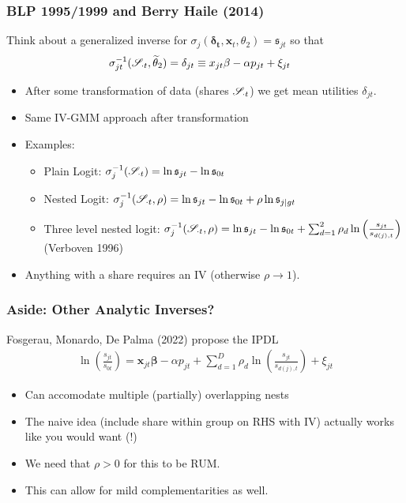 \documentclass[aspectratio=169,10pt]{beamer}
\begin{document}
\begin{frame}
\frametitle{BLP 1995/1999 and Berry Haile (2014)}
Think about a \alert{generalized inverse} for $\sigma_{j}(\symbf{\delta_{t}}, \symbf{x}_t,\theta_2) = \mathfrak{s}_{jt}$ so that 
\begin{align*}
 \sigma_{jt}^{-1}(\mathscr{S}_{\cdot t},\widetilde{\theta}_2)&= \delta_{jt} \equiv x_{jt} \beta -\alpha p_{jt} +  \xi_{jt} 
\end{align*}
 \begin{itemize}
\item After some transformation of data (shares $\mathscr{S}_{\cdot t}$) we get \alert{mean utilities} $\delta_{jt}$.
\item Same IV-GMM approach after transformation
\item Examples:
\begin{itemize}
\item Plain Logit: $\sigma_{j}^{-1}(\mathscr{S}_{\cdot t}) = \ln \mathfrak{s}_{jt}- \ln \mathfrak{s}_{0t}$
\item Nested Logit: $\sigma_{j}^{-1}(\mathscr{S}_{\cdot t},\rho) = \ln \mathfrak{s}_{jt}- \ln \mathfrak{s}_{0t} + \rho  \ln \mathfrak{s}_{j|gt}$
\item Three level nested logit: $\sigma_{j}^{-1}(\mathscr{S}_{\cdot t},\rho) = \ln \mathfrak{s}_{jt}- \ln \mathfrak{s}_{0t} +\sum_{d=1}^2 \rho_d \ln \left(\frac{s_{j t}}{s_{d(j), t}}\right)$ (Verboven 1996)
 \end{itemize}
 \item Anything with a share requires an IV (otherwise $\rho \rightarrow 1$).
 \end{itemize}
\end{frame}


\begin{frame}
\frametitle{Aside: Other Analytic Inverses?}
Fosgerau, Monardo, De Palma (2022) propose the IPDL
\begin{align*}
\ln \left(\frac{s_{j t}}{s_{0 t}}\right)=\symbf{x}_{j t} \symbf{\beta}-\alpha p_{j t}+\sum_{d=1}^D \rho_d \ln \left(\frac{s_{j t}}{s_{d(j), t}}\right)+\xi_{j t}
\end{align*}
 \begin{itemize}
\item Can accomodate multiple (partially) overlapping nests
\item The naive idea (include share within group on RHS with IV) actually works like you would want (!)
\item We need that $\rho > 0$ for this to be RUM.
\item This can allow for mild complementarities as well.
 \end{itemize}
\end{frame}
\end{document}
